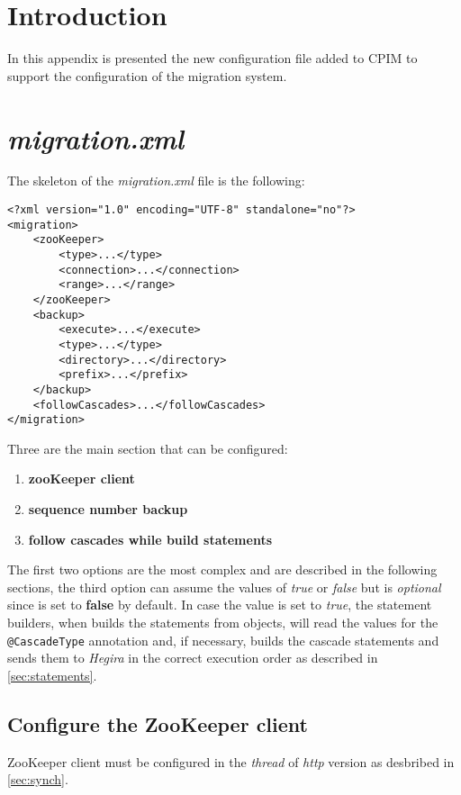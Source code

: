 \section{Introduction}
In this appendix is presented the new configuration file added to CPIM to support the configuration of the migration system.

\section{\textit{migration.xml}}
The skeleton of the \textit{migration.xml} file is the following:

\begin{verbatim}
<?xml version="1.0" encoding="UTF-8" standalone="no"?>
<migration>
    <zooKeeper>
        <type>...</type>
        <connection>...</connection>
        <range>...</range>
    </zooKeeper>
    <backup>
        <execute>...</execute>
        <type>...</type>
        <directory>...</directory>
        <prefix>...</prefix>
    </backup>
    <followCascades>...</followCascades>
</migration>
\end{verbatim}

\noindent Three are the main section that can be configured:
\begin{enumerate}
\item \textbf{zooKeeper client}
\item \textbf{sequence number backup}
\item \textbf{follow cascades while build statements}
\end{enumerate}

\noindent The first two options are the most complex and are described in the following sections, the third option can assume the values of \textit{true} or \textit{false} but is \textit{optional} since is set to \textbf{false} by default.
In case the value is set to \textit{true}, the statement builders, when builds the statements from objects, will read the values for the \texttt{@CascadeType} annotation and, if necessary, builds the cascade statements and sends them to \textit{Hegira} in the correct execution order as described in \ref{sec:statements}.

\subsection{Configure the ZooKeeper client}
ZooKeeper client must be configured in the \textit{thread} of \textit{http} version as desbribed in \ref{sec:synch}.

